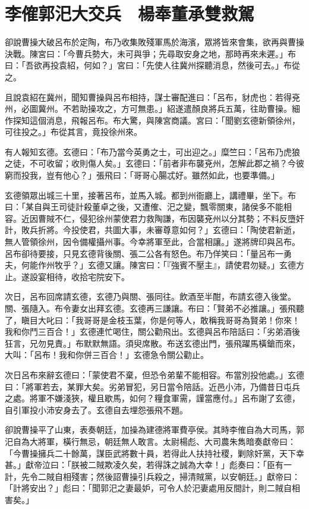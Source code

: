 
\chapter{李傕郭汜大交兵　楊奉董承雙救駕}

卻說曹操大破呂布於定陶，布乃收集敗殘軍馬於海濱，眾將皆來會集，欲再與曹操決戰。陳宮曰：「今曹兵勢大，未可與爭；先尋取安身之地，那時再來未遲。」布曰：「吾欲再投袁紹，何如？」宮曰：「先使人往冀州探聽消息，然後可去。」布從之。

且說袁紹在冀州，聞知曹操與呂布相持，謀士審配進曰：「呂布，豺虎也：若得兗州，必圖冀州。不若助操攻之，方可無患。」紹遂遣顏良將兵五萬，往助曹操。細作探知這個消息，飛報呂布。布大驚，與陳宮商議。宮曰：「聞劉玄德新領徐州，可往投之。」布從其言，竟投徐州來。

有人報知玄德。玄德曰：「布乃當今英勇之士，可出迎之。」糜竺曰：「呂布乃虎狼之徒，不可收留；收則傷人矣。」玄德曰：「前者非布襲兗州，怎解此郡之禍？今彼窮而投我，豈有他心？」張飛曰：「哥哥心腸忒好。雖然如此，也要準備。」

玄德領眾出城三十里，接著呂布，並馬入城。都到州衙廳上，講禮畢，坐下。布曰：「某自與王司徒計殺董卓之後，又遭傕、汜之變，飄零關東，諸侯多不能相容。近因曹賊不仁，侵犯徐州蒙使君力救陶謙，布因襲兗州以分其勢；不料反墮奸計，敗兵折將。今投使君，共圖大事，未審尊意如何？」玄德曰：「陶使君新逝，無人管領徐州，因令備權攝州事。今幸將軍至此，合當相讓。」遂將牌印與呂布。呂布卻待要接，只見玄德背後關、張二公各有怒色。布乃佯笑曰：「量呂布一勇夫，何能作州牧乎？」玄德又讓。陳宮曰：「『強賓不壓主』，請使君勿疑。」玄德方止。遂設宴相待，收拾宅院安下。

次日，呂布回席請玄德，玄德乃與關、張同往。飲酒至半酣，布請玄德入後堂。關、張隨入。布令妻女出拜玄德。玄德再三謙讓。布曰：「賢弟不必推讓。」張飛聽了，瞋目大叱曰：「我哥哥是金枝玉葉，你是何等人，敢稱我哥哥為賢弟！你來！我和你鬥三百合！」玄德連忙喝住，關公勸飛出。玄德與呂布陪話曰：「劣弟酒後狂言，兄勿見責。」布默默無語。須臾席散。布送玄德出門，張飛躍馬橫鎗而來，大叫：「呂布！我和你併三百合！」玄德急令關公勸止。

次日呂布來辭玄德曰：「蒙使君不棄，但恐令弟輩不能相容。布當別投他處。」玄德曰：「將軍若去，某罪大矣。劣弟冒犯，另日當令陪話。近邑小沛，乃備昔日屯兵之處。將軍不嫌淺狹，權且歇馬，如何？糧食軍需，謹當應付。」呂布謝了玄德，自引軍投小沛安身去了。玄德自去埋怨張飛不題。

卻說曹操平了山東，表奏朝廷，加操為建德將軍費亭侯。其時李傕自為大司馬，郭汜自為大將軍，橫行無忌，朝廷無人敢言。太尉楊彪、大司農朱雋暗奏獻帝曰：「今曹操擁兵二十餘萬，謀臣武將數十員，若得此人扶持社稷，剿除奸黨，天下幸甚。」獻帝泣曰：「朕被二賊欺凌久矣，若得誅之誠為大幸！」彪奏曰：「臣有一計，先令二賊自相殘害；然後詔曹操引兵殺之，掃清賊黨，以安朝廷。」獻帝曰：「計將安出？」彪曰：「聞郭汜之妻最妒，可令人於汜妻處用反間計，則二賊自相害矣。」

